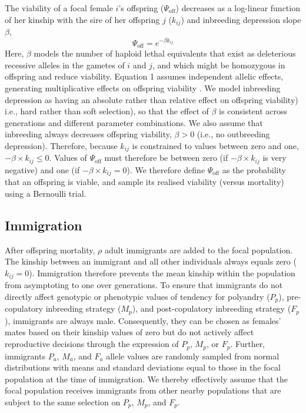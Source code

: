 \documentclass[10pt,letterpaper]{article}
\begin{document}
The viability of a focal female $i$'s offspring ($\Psi_{\textrm{off}}$) decreases as a log-linear function of her kinship with the sire of her offspring $j$ ($k_{ij}$) and inbreeding depression slope $\beta$,
\begin{equation}
\Psi_{\textrm{off}} = e^{-\beta k_{ij}}
\end{equation}
Here, $\beta$ models the number of haploid lethal equivalents that exist as deleterious recessive alleles in the gametes of $i$ and $j$, and which might be homozygous in offspring and reduce viability. Equation 1 assumes independent allelic effects, generating multiplicative effects on offspring viability \cite[][]{Morton1956, Mills1994}. We model inbreeding depression as having an absolute rather than relative effect on offspring viability) i.e., hard rather than soft selection), so that the effect of $\beta$ is consistent across generations and different parameter combinations. We also assume that inbreeding always decreases offspring viability, $\beta > 0$ (i.e., no outbreeding depression). Therefore, because $k_{ij}$ is constrained to values between zero and one, $-\beta \times k_{ij} \leq 0$. Values of $\Psi_{\textrm{off}}$ must therefore be between zero (if $-\beta \times k_{ij}$ is very negative) and one (if $-\beta \times k_{ij} = 0$). We therefore define $\Psi_{\textrm{off}}$ as the probability that an offspring is viable, and sample its realised viability (versus mortality) using a Bernoulli trial.

\subsection*{Immigration}

After offspring mortality, $\rho$ adult immigrants are added to the focal population. The kinship between an immigrant and all other individuals always equals zero ($k_{ij}=0$). Immigration therefore prevents the mean kinship within the population from asymptoting to one over generations. To ensure that immigrants do not directly affect genotypic or phenotypic values of tendency for polyandry ($P_{p}$), pre-copulatory inbreeding strategy ($M_{p}$), and post-copulatory inbreeding strategy ($F_{p}$), immigrants are always male. Consequently, they can be chosen as females' mates based on their kinship values of zero but do not actively affect reproductive decisions through the expression of $P_{p}$, $M_{p}$, or $F_{p}$. Further, immigrants $P_{a}$, $M_{a}$, and $F_{a}$ allele values are randomly sampled from normal distributions with means and standard deviations equal to those in the focal population at the time of immigration. We thereby effectively assume that the focal population receives immigrants from other nearby populations that are subject to the same selection on $P_{p}$, $M_{p}$, and $F_{p}$.
\end{document}
